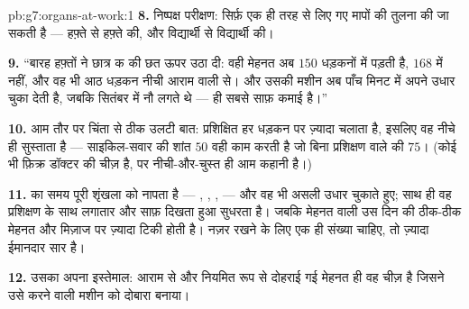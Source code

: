 \begin{solution}{pb:g7:organs-at-work:1}
\textbf{8.} निष्पक्ष परीक्षण: सिर्फ़ एक ही तरह से लिए गए मापों की तुलना
की जा सकती है --- हफ़्ते से हफ़्ते की, और विद्यार्थी से विद्यार्थी की।

\textbf{9.} ``बारह हफ़्तों ने छात्र क की छत ऊपर उठा दी: वही मेहनत अब
$150$ धड़कनों में पड़ती है, $168$ में नहीं, और वह भी आठ धड़कन नीची आराम
वाली  से। और उसकी मशीन अब पाँच मिनट में अपने उधार चुका देती है,
जबकि सितंबर में नौ लगते थे ---  ही सबसे साफ़ कमाई है।''

\textbf{10.} आम तौर पर चिंता से ठीक उलटी बात: प्रशिक्षित  हर धड़कन
पर ज़्यादा  चलाता है, इसलिए वह नीचे ही सुस्ताता है --- साइकिल-सवार
की शांत $50$ वही काम करती है जो बिना प्रशिक्षण वाले की $75$। (कोई भी
फ़िक्र डॉक्टर की चीज़ है, पर नीची-और-चुस्त ही आम कहानी है।)

\textbf{11.}  का समय पूरी शृंखला को नापता है --- , ,
,  --- और वह भी असली उधार चुकाते हुए; साथ ही वह
प्रशिक्षण के साथ लगातार और साफ़ दिखता हुआ सुधरता है। जबकि मेहनत वाली
 उस दिन की ठीक-ठीक मेहनत और मिज़ाज पर ज़्यादा टिकी होती है। नज़र
रखने के लिए एक ही संख्या चाहिए, तो  ज़्यादा ईमानदार सार है।

\textbf{12.} उसका अपना इस्तेमाल: आराम से और नियमित रूप से दोहराई गई
मेहनत ही वह चीज़ है जिसने उसे करने वाली मशीन को दोबारा बनाया।
\end{solution}
